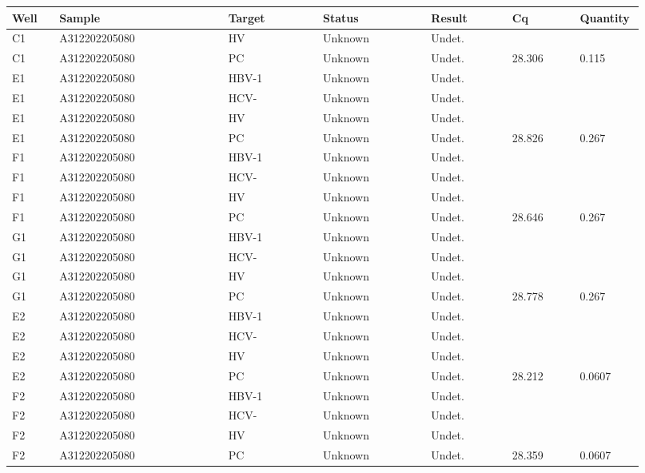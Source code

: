 \documentclass[UTF8,10pt,a4paper,fontset=fandol]{ctexart}
\begin{document}
\begin{center}
\small
\begin{tabular}{@{}p{0.07\linewidth}p{0.25\linewidth}p{0.14\linewidth}p{0.16\linewidth}p{0.12\linewidth}p{0.10\linewidth}p{0.08\linewidth}@{}}
\textbf{Well} & \textbf{Sample} & \textbf{Target} & \textbf{Status} & \textbf{Result} & \textbf{Cq} & \textbf{Quantity} \\
\hline
C1 & A312202205080 & HV & Unknown & Undet. & & \\
C1 & A312202205080 & PC & Unknown & Undet. & 28.306 & 0.115 \\
\hline
E1 & A312202205080 & HBV-1 & Unknown & Undet. & & \\
E1 & A312202205080 & HCV- & Unknown & Undet. & & \\
E1 & A312202205080 & HV & Unknown & Undet. & & \\
E1 & A312202205080 & PC & Unknown & Undet. & 28.826 & 0.267 \\
\hline
F1 & A312202205080 & HBV-1 & Unknown & Undet. & & \\
F1 & A312202205080 & HCV- & Unknown & Undet. & & \\
F1 & A312202205080 & HV & Unknown & Undet. & & \\
F1 & A312202205080 & PC & Unknown & Undet. & 28.646 & 0.267 \\
\hline
G1 & A312202205080 & HBV-1 & Unknown & Undet. & & \\
G1 & A312202205080 & HCV- & Unknown & Undet. & & \\
G1 & A312202205080 & HV & Unknown & Undet. & & \\
G1 & A312202205080 & PC & Unknown & Undet. & 28.778 & 0.267 \\
\hline
E2 & A312202205080 & HBV-1 & Unknown & Undet. & & \\
E2 & A312202205080 & HCV- & Unknown & Undet. & & \\
E2 & A312202205080 & HV & Unknown & Undet. & & \\
E2 & A312202205080 & PC & Unknown & Undet. & 28.212 & 0.0607 \\
\hline
F2 & A312202205080 & HBV-1 & Unknown & Undet. & & \\
F2 & A312202205080 & HCV- & Unknown & Undet. & & \\
F2 & A312202205080 & HV & Unknown & Undet. & & \\
F2 & A312202205080 & PC & Unknown & Undet. & 28.359 & 0.0607 \\
\end{tabular}
\end{center}
\end{document}

